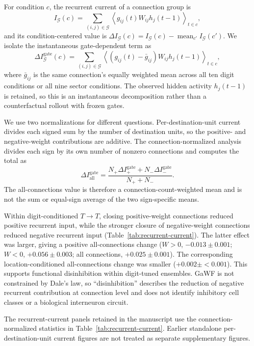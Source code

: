 For condition \(c\), the recurrent current of a connection group is
\[
I_{\mathcal G}(c)=\sum_{(i,j)\in\mathcal G}\left\langle g_{ij}(t)W_{ij}h_j(t-1)\right\rangle_{t\in c},
\]
and its condition-centered value is \(\Delta I_{\mathcal G}(c)=I_{\mathcal G}(c)-\operatorname{mean}_{c'}I_{\mathcal G}(c')\). We isolate the instantaneous gate-dependent term as
\[
\Delta I^{\mathrm{gate}}_{\mathcal G}(c)=\sum_{(i,j)\in\mathcal G}\left\langle\left(g_{ij}(t)-\bar g_{ij}\right)W_{ij}h_j(t-1)\right\rangle_{t\in c},
\]
where \(\bar g_{ij}\) is the same connection's equally weighted mean across all ten digit conditions or all nine sector conditions. The observed hidden activity \(h_j(t-1)\) is retained, so this is an instantaneous decomposition rather than a counterfactual rollout with frozen gates.

We use two normalizations for different questions. Per-destination-unit current divides each signed sum by the number of destination units, so the positive- and negative-weight contributions are additive. The connection-normalized analysis divides each sign by its own number of nonzero connections and computes the total as
\[
\Delta I^{\mathrm{gate}}_{\mathrm{all}}=
\frac{N_+\Delta I^{\mathrm{gate}}_+ + N_-\Delta I^{\mathrm{gate}}_-}{N_++N_-}.
\]
The all-connections value is therefore a connection-count-weighted mean and is not the sum or equal-sign average of the two sign-specific means.

Within digit-conditioned \(T\!\to\!T\), closing positive-weight connections reduced positive recurrent input, while the stronger closure of negative-weight connections reduced negative recurrent input (Table~\ref{tab:recurrent-current}). The latter effect was larger, giving a positive all-connections change (\(W>0\), \(-0.013\pm0.001\); \(W<0\), \(+0.056\pm0.003\); all connections, \(+0.025\pm0.001\)). The corresponding location-conditioned all-connections change was smaller (\(+0.002\pm{<}0.001\)). This supports functional disinhibition within digit-tuned ensembles. GaWF is not constrained by Dale's law, so ``disinhibition'' describes the reduction of negative recurrent contribution at connection level and does not identify inhibitory cell classes or a biological interneuron circuit.



The recurrent-current panels retained in the manuscript use the connection-normalized statistics in Table~\ref{tab:recurrent-current}. Earlier standalone per-destination-unit current figures are not treated as separate supplementary figures.
